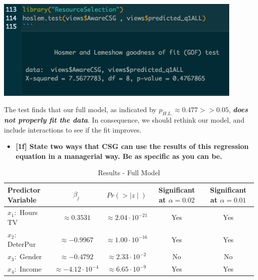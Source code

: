 \documentclass[10pt, oneside,spanish]{article}
\begin{document}
\begin{center}
\includegraphics[width=12cm]{hltest.png}
\end{center}

The test finds that our full model, as indicated by $p_{H.L.} \approx 0.477 >> 0.05 $, \textit{\textbf{does not properly fit the data}}. In consequence, we should rethink our model, and include interactions to see if the fit improves.


\pagebreak


\begin{itemize}
\item \textbf{[1f] State two ways that CSG can use the results of this regression equation in a managerial way.  Be as specific as you can be.}
\end{itemize}

\begin{table}[ht]
\caption{ Results - Full Model} %
\centering %
\begin{tabular}{l c c c c} %
\hline\hline %
Predictor Variable & $\beta_j $ & \textbf{$Pr(>\mid z \mid )$} & Significant at $\alpha = 0.02$ & Significant at $\alpha = 0.01$ \\ [1.5ex] %
\hline %
$x_1:$ Hours TV  &  $\approx 0.3531  $ & $ \approx 2.04 \cdot 10^{-21}$ & Yes & Yes \\ %
$x_2: $ DeterPur  &  $\approx -0.9967  $ & $ \approx 1.00 \cdot 10^{-16}$ & Yes & Yes  \\
$x_3:$  Gender &  $\approx -0.4792  $ & $ \approx 2.33 \cdot 10^{-2}$& No & No  \\
$x_4:$  Income  &  $\approx -4.12 \cdot 10^{-4} $& $ \approx 6.65 \cdot 10^{-9}$ & Yes & Yes    \\[1ex] %
\hline %
\end{tabular}
\label{table:full} %
\end{table}
\end{document}

